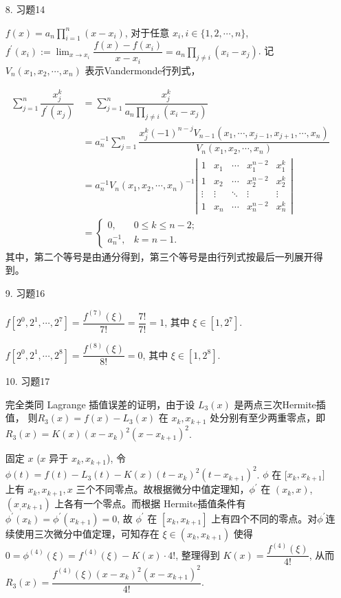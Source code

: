 \documentclass{article}
\begin{document}
\begin{spacing}{1.5}
\begin{itemize}
    \item [8.] 习题14 
    
    $f(x) = a_n\prod_{i=1}^n (x-x_i)$, 对于任意 $x_i, i\in\{1,2,\cdots, n\}$, $f^\prime(x_i):=\lim_{x\to x_i}\dfrac{f(x) - f(x_i)}{x - x_i} = a_n\prod_{j\ne i} (x_i - x_j)$. 记 $V_n(x_1, x_2, \cdots, x_n)$ 表示Vandermonde行列式，

    $$\begin{array}{ll}
    \sum\limits_{j=1}^{n} \dfrac{x_j^k}{f^\prime(x_j)} &= \sum\limits_{j=1}^n \dfrac{x_j^k}{a_n\prod_{j\ne i} (x_i - x_j)}\\&= a_n^{-1}\sum_{j=1}^n \dfrac{x_j^k (-1)^{n-j} V_{n-1}(x_1, \cdots, x_{j-1}, x_{j+1}, \cdots, x_n)}{V_n(x_1, x_2, \cdots, x_n)}\\ &= a_n^{-1} V_n(x_1,x_2,\cdots, x_n)^{-1} \left|\begin{array}{ccccc}1&x_1&\cdots&x_1^{n-2}&x_1^k\\1&x_2&\cdots&x_2^{n-2}&x_2^k\\\vdots&\vdots&\ddots&\vdots&\vdots\\1&x_n&\cdots&x_n^{n-2}&x_n^k\end{array}\right|\\&=\left\{\begin{array}{ll}0,&0\leq k\leq n-2;\\a_n^{-1},&k=n-1.\end{array}\right. 
    \end{array}$$
    其中，第二个等号是由通分得到，第三个等号是由行列式按最后一列展开得到。

    \item [9.] 习题16
    
    $f[2^0, 2^1, \cdots, 2^7] = \dfrac{f^{(7)}(\xi)}{7!} = \dfrac{7!}{7!} = 1$, 其中 $\xi\in[1, 2^7]$.

    $f[2^0, 2^1, \cdots, 2^8] = \dfrac{f^{(8)}(\xi)}{8!} = 0$, 其中 $\xi\in[1, 2^8]$.

    \item [10.] 习题17
    
    完全类同 Lagrange 插值误差的证明，由于设 $L_3(x)$ 是两点三次Hermite插值， 则$R_3(x) = f(x) - L_3(x)$ 在 $x_k,x_{k+1}$ 处分别有至少两重零点，即 $R_3(x) = K(x)(x-x_k)^2(x - x_{k+1})^2$. 
    
    固定 $x$ ($x$ 异于 $x_k, x_{k+1}$), 令 $\phi(t) = f(t) - L_3(t) - K(x)(t-x_k)^2(t-x_{k+1})^2$. $\phi$ 在 [$x_k, x_{k+1}]$ 上有 $x_k, x_{k+1}, x$ 三个不同零点。故根据微分中值定理知，$\phi^\prime$ 在 $(x_k, x)$, $(x_, x_{k+1})$ 上各有一个零点。而根据 Hermite插值条件有 $\phi^\prime(x_k) = \phi^\prime(x_{k+1}) = 0$, 故 $\phi^\prime$ 在 $[x_k, x_{k+1}]$ 上有四个不同的零点。对$\phi^\prime$连续使用三次微分中值定理，可知存在 $\xi\in(x_k, x_{k+1})$ 使得 $0=\phi^{(4)}(\xi) = f^{(4)}(\xi) - K(x)\cdot 4!$, 整理得到 $K(x) = \dfrac{f^{(4)}(\xi)}{4!}$, 从而 $R_3(x) = \dfrac{f^{(4)}(\xi)(x-x_k)^2(x-x_{k+1})^2}{4!}$. 


\end{itemize}
\end{spacing}
\end{document}
